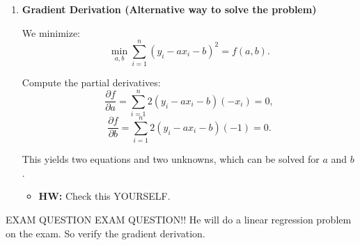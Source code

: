 \begin{example}
\begin{enumerate}
        \item \textbf{Gradient Derivation (Alternative way to solve the problem)}
    
        We minimize:
        \[
        \min_{a, b} \sum_{i=1}^n (y_i - ax_i - b)^2 = f(a, b).
        \]
    
        Compute the partial derivatives:
        \[
        \frac{\partial f}{\partial a} = \sum_{i=1}^n 2(y_i - ax_i - b)(-x_i) = 0,
        \]
        \[
        \frac{\partial f}{\partial b} = \sum_{i=1}^n 2(y_i - ax_i - b)(-1) = 0.
        \]
    
        This yields two equations and two unknowns, which can be solved for \( a \) and \( b \).
        \begin{itemize}
            \item \textbf{HW:} Check this YOURSELF.
        \end{itemize}
    \end{enumerate}

\end{example}

\begin{warning}
    EXAM QUESTION EXAM QUESTION!! He will do a linear regression problem on the exam. So verify the gradient derivation. 
\end{warning}

